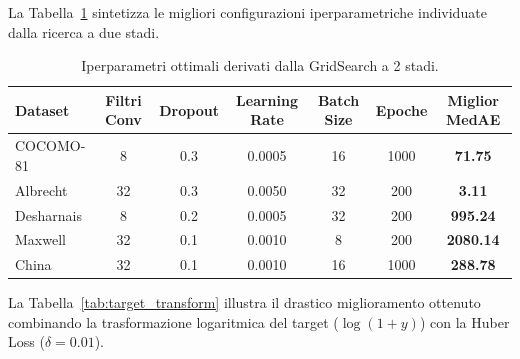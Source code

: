 \documentclass[11pt, a4paper]{article}
\begin{document}
La Tabella~\ref{tab:gridsearch} sintetizza le migliori configurazioni
iperparametriche individuate dalla ricerca a due stadi.

\begin{table}[htbp]
    \centering
    \caption{Iperparametri ottimali derivati dalla GridSearch a 2 stadi.}\label{tab:gridsearch}
    \small
    \begin{tabular}{lcccccc}
        \toprule
        \rowcolor{tableheader} \textbf{Dataset} & \textbf{Filtri Conv} & \textbf{Dropout} & \textbf{Learning Rate} & \textbf{Batch Size} & \textbf{Epoche} & \textbf{Miglior MedAE} \\
        \midrule
        COCOMO-81                               & 8                    & 0.3              & 0.0005                 & 16                  & 1000            & \textbf{71.75}         \\
        \rowcolor{lightbg} Albrecht             & 32                   & 0.3              & 0.0050                 & 32                  & 200             & \textbf{3.11}          \\
        Desharnais                              & 8                    & 0.2              & 0.0005                 & 32                  & 200             & \textbf{995.24}        \\
        \rowcolor{lightbg} Maxwell              & 32                   & 0.1              & 0.0010                 & 8                   & 200             & \textbf{2080.14}       \\
        China                                   & 32                   & 0.1              & 0.0010                 & 16                  & 1000            & \textbf{288.78}        \\
        \bottomrule
    \end{tabular}
\end{table}

La Tabella~\ref{tab:target_transform} illustra il drastico miglioramento
ottenuto combinando la trasformazione logaritmica del target ($\log(1+y)$) con
la Huber Loss ($\delta=0.01$).
\end{document}

